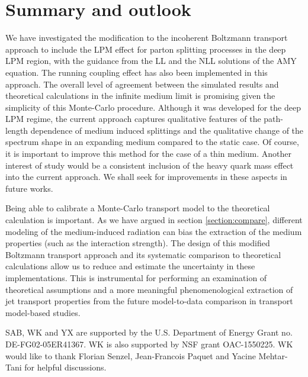 \documentclass[aps, prc, reprint, amsmath, groupedaddress, nofootinbib]{revtex4-1}
\begin{document}
\section{Summary and outlook}\label{section:summary}
We have investigated the modification to the incoherent Boltzmann transport approach to include the LPM effect for parton splitting processes in the deep LPM region, with the guidance from the LL and the NLL solutions of the AMY equation.
The running coupling effect has also been implemented in this approach.
The overall level of agreement between the simulated results and theoretical calculations in the infinite medium limit is promising given the simplicity of this Monte-Carlo procedure. 
Although it was developed for the deep LPM regime, the current approach captures qualitative features of the path-length dependence of medium induced splittings and the qualitative change of the spectrum shape in an expanding medium compared to the static case.
Of course, it is important to improve this method for the case of a thin medium.
Another interest of study would be a consistent inclusion of the heavy quark mass effect into the current approach.
We shall seek for improvements in these aspects in future works.

Being able to calibrate a Monte-Carlo transport model to the theoretical calculation is important.
As we have argued in section \ref{section:compare}, different modeling of the medium-induced radiation can bias the extraction of the medium properties (such as the interaction strength).
The design of this modified Boltzmann transport approach and its systematic comparison to theoretical calculations allow us to reduce and estimate the uncertainty in these implementations.
This is instrumental for performing an examination of theoretical assumptions and a more meaningful phenomenological extraction of jet transport properties from the future model-to-data comparison in transport model-based studies.

\begin{acknowledgments}
SAB, WK and YX are supported by the U.S. Department of Energy Grant no. DE-FG02-05ER41367. WK is also supported by NSF grant OAC-1550225.
WK would like to thank Florian Senzel, Jean-Francois Paquet and Yacine Mehtar-Tani for helpful discussions.
\end{acknowledgments}
\end{document}
